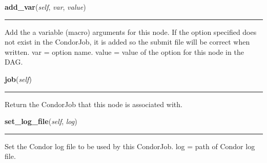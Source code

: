     \noindent\begin{boxedminipage}{\textwidth}

    \raggedright \textbf{add\_var}(\textit{self}, \textit{var}, \textit{value})

    \vspace{-1.5ex}

    \rule{\textwidth}{0.5\fboxrule}
    Add the a variable (macro) arguments for this node. If the option 
    specified does not exist in the CondorJob, it is added so the submit 
    file will be correct when written. var = option name. value = value 
    of the option for this node in the DAG.

    \vspace{1ex}

    \end{boxedminipage}

    \label{pipeline:CondorDAGNode:job}
    \vspace{0.5ex}

    \noindent\begin{boxedminipage}{\textwidth}

    \raggedright \textbf{job}(\textit{self})

    \vspace{-1.5ex}

    \rule{\textwidth}{0.5\fboxrule}
    Return the CondorJob that this node is associated with.

    \vspace{1ex}

    \end{boxedminipage}

    \label{pipeline:CondorDAGNode:set_log_file}
    \vspace{0.5ex}

    \noindent\begin{boxedminipage}{\textwidth}

    \raggedright \textbf{set\_log\_file}(\textit{self}, \textit{log})

    \vspace{-1.5ex}

    \rule{\textwidth}{0.5\fboxrule}
    Set the Condor log file to be used by this CondorJob. log = path of 
    Condor log file.

    \vspace{1ex}

    \end{boxedminipage}

